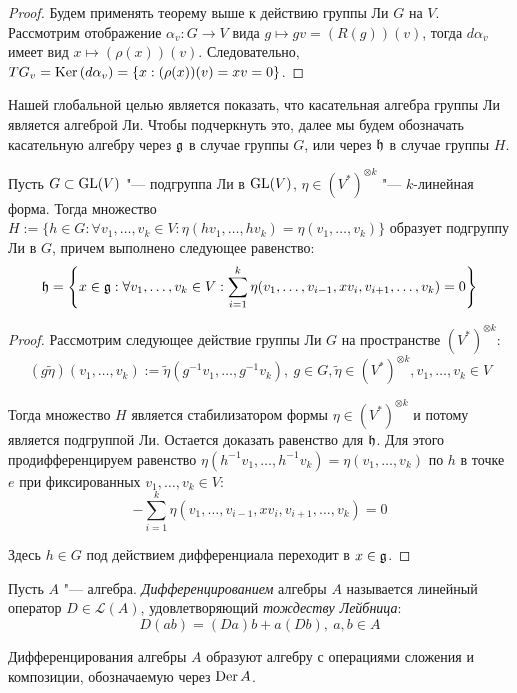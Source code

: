 \begin{proof}
	Будем применять теорему выше к действию группы Ли $G$ на $V$. Рассмотрим отображение $\alpha_v: G \to V$ вида $g \mapsto gv = (R(g))(v)$, тогда $d\alpha_v$ имеет вид $x \mapsto (\rho(x))(v)$. Следовательно, $TG_v = \operatorname{Ker}{(d\alpha_v)} = \{x : (\rho(x))(v) = xv = 0\}$.
\end{proof}

\begin{note}
	Нашей глобальной целью является показать, что касательная алгебра группы Ли является алгеброй Ли. Чтобы подчеркнуть это, далее мы будем обозначать касательную алгебру через $\mathfrak g$ в случае группы $G$, или через $\mathfrak h$ в случае группы $H$.
\end{note}

\begin{theorem}
	Пусть $G \subset \operatorname{GL}(V)$ "--- подгруппа Ли в $\operatorname{GL}(V)$, $\eta \in (V^*)^{\otimes k}$ "--- $k$-линейная форма. Тогда множество $H := \{h \in G: \forall v_1, \dotsc, v_k \in V: \eta(hv_1, \dotsc, hv_k) = \eta(v_1, \dotsc, v_k)\}$ образует подгруппу Ли в $G$, причем выполнено следующее равенство:
	\[\mathfrak h = \left\{x \in \mathfrak g: \forall v_1, \dotsc, v_k \in V: \sum_{i = 1}^k\eta(v_1, \dotsc, v_{i - 1}, x v_i, v_{i+1}, \dotsc, v_k) = 0\right\}\]
\end{theorem}

\begin{proof}
	Рассмотрим следующее действие группы Ли $G$ на пространстве $(V^*)^{\otimes k}$:
	\[(g\widetilde\eta)(v_1, \dotsc, v_k) := \widetilde\eta(g^{-1}v_1, \dotsc, g^{-1}v_k),~g \in G, \widetilde\eta \in (V^*)^{\otimes k}, v_1, \dotsc, v_k \in V\]
	
	Тогда множество $H$ является стабилизатором формы $\eta \in (V^*)^{\otimes k}$ и потому является подгруппой Ли. Остается доказать равенство для $\mathfrak h$. Для этого продифференцируем равенство $\eta(h^{-1}v_1, \dotsc, h^{-1}v_k) = \eta(v_1, \dotsc, v_k)$ по $h$ в точке $e$ при фиксированных $v_1, \dotsc, v_k \in V$:
	\[-\sum_{i = 1}^k\eta(v_1, \dotsc, v_{i - 1}, x v_i, v_{i+1}, \dotsc, v_k) = 0\]
	
	Здесь $h \in G$ под действием дифференциала переходит в $x \in \mathfrak g$.
\end{proof}

\begin{definition}
	Пусть $A$ "--- алгебра. \textit{Дифференцированием} алгебры $A$ называется линейный оператор $D \in \mathcal{L}(A)$, удовлетворяющий \textit{тождеству Лейбница}:
	\[D(ab) = (Da)b + a(Db),~a, b \in A\]
	
	Дифференцирования алгебры $A$ образуют алгебру с операциями сложения и композиции, обозначаемую через $\operatorname{Der}{A}$.
\end{definition}

